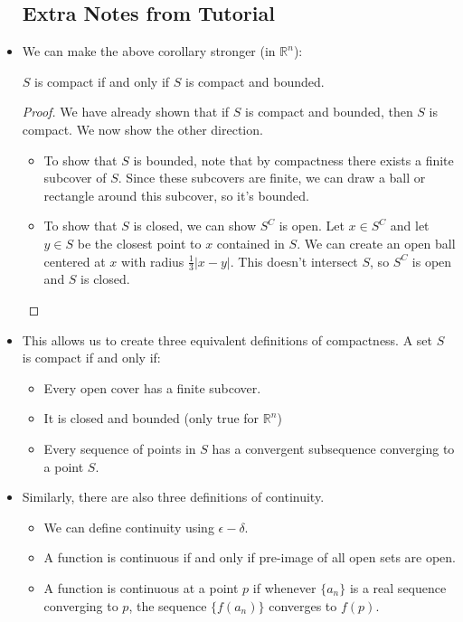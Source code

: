 \begin{itemize}
          \subsection{Extra Notes from Tutorial}
    \item We can make the above corollary stronger (in $\mathbb{R}^n$):
          \begin{theorem}
              $S$ is compact if and only if $S$ is compact and bounded.
          \end{theorem}
          \begin{proof}
              We have already shown that if $S$ is compact and bounded, then $S$ is compact. We now show the other direction.
              \begin{itemize}
                  \item To show that $S$ is bounded, note that by compactness there exists a finite subcover of $S$. Since these subcovers are finite, we can draw a ball or rectangle around this subcover, so it's bounded.
                  \item To show that $S$ is closed, we can show $S^C$ is open. Let $x\in S^C$ and let $y\in S$ be the closest point to $x$ contained in $S$. We can create an open ball centered at $x$ with radius $\frac{1}{3}|x-y|.$ This doesn't intersect $S$, so $S^C$ is open and $S$ is closed.
              \end{itemize}
          \end{proof}
    \item This allows us to create three equivalent definitions of compactness. A set $S$ is compact if and only if:
          \begin{itemize}
              \item Every open cover has a finite subcover.
              \item It is closed and bounded (only true for $\mathbb{R}^n$)
              \item Every sequence of points in $S$ has a convergent subsequence converging to a point $S$.
          \end{itemize}
    \item Similarly, there are also three definitions of continuity.
          \begin{itemize}
              \item We can define continuity using $\epsilon-\delta.$
              \item A function is continuous if and only if pre-image of all open sets are open.
              \item A function is continuous at a point $p$ if whenever $\{a_n\}$ is a real sequence converging to $p$, the sequence $\{f(a_n)\}$ converges to $f(p).$

\end{itemize}
\end{itemize}
